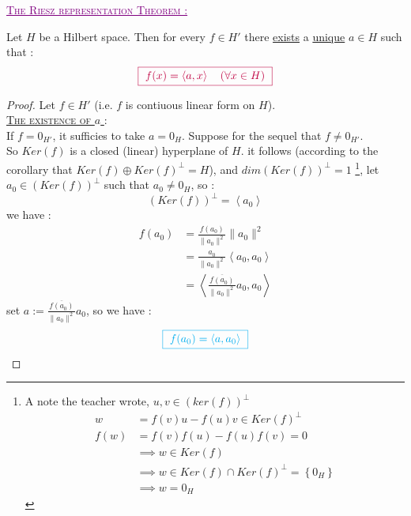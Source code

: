 \begin{center}
  \textcolor{purple}{
  \textsc{
    \underline{
      The Riesz representation Theorem :
    }
  }
  }
\end{center}
\begin{theorem}[(F. Riesz)]
  Let $H$ be a Hilbert space. Then for 
  every $f \in  H' $ there \underline{exists} a 
  \underline{unique} $a \in H $ such that :
  \[
    \textcolor{purple}{
      \fbox{
        $f(x) = \left\langle a,x \right\rangle  \quad 
        \left( \forall x \in  H \right)$
      }
    }
  \]
\end{theorem}
\begin{proof}
Let $f \in  H' $ (i.e. $f $ is contiuous linear form on $H $).
\\
\textsc{
  \large
\underline{
  The existence of $a$   
} : 
\warning
\normalfont
}
\\
If $f = 0_{H'} $, it sufficies to take $a = 0_{H} $. 
Suppose for the sequel that $ f \neq 0_{H'} $. \\
So $Ker(f)$ is a closed (linear) hyperplane of $H $. 
it follows (according to the corollary that $Ker(f) \oplus Ker(f)^{\bot } = H$),
and $dim(Ker(f))^{\bot } = 1$ \footnote {
  A note the teacher wrote, $u, v \in  (ker(f) )^{\bot }$   
  \begin{align*}
    w &= f(v) u - f(u)  v \in Ker(f)^{\bot }  
    \\
    f(w) &=  f(v) f(u)  - f(u) f(v)  = 0
    \\
       &\implies  w \in  Ker(f) \\
       &\implies w \in Ker(f) \cap Ker(f) ^{\bot } = 
    \left\{ 0_{H} \right\} \\
         &\implies 
         w = 0_{H}
  \end{align*}
}, 
let $a_0 \in  (Ker(f) ) ^{\bot } $ such that 
$a_0 \neq 0_{H} $, so : 
\[
  (Ker(f) ) ^{\bot } = 
  \left\langle 
    a_{0}
  \right\rangle 
\]
we have :  
\begin{align*}
  f(a_0)  &= 
  \frac{f(a_0) }{\| a_0 \| ^2 }
  \| a_0 \| ^2  \\
          &= 
          \frac{a_0}{\| a_0 \| ^2 } 
          \left\langle 
            a_0, a_0
          \right\rangle  \\
         &=
         \left\langle 
           \frac{\overline{f(a_0) }}{\| a_0 \| ^2 } 
           a_0, a_0
         \right\rangle  
\end{align*}
set $a := \frac{\overline{f(a_0) }}{\| a_0 \| ^2 }a_0$, so we have :  
\[
  \textcolor{cyan}{
   \fbox{
     $f(a_0) = \left\langle a, a_0 \right\rangle $
}}\]
\end{proof}
